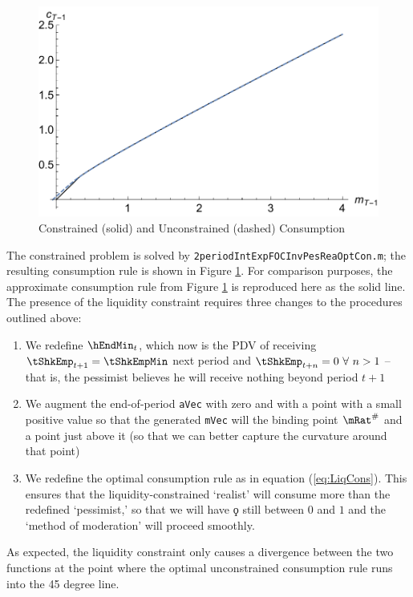 \documentclass[titlepage]{\econtex}
\begin{document}
\hypertarget{cVScCon}{}
\begin{figure}
        \includegraphics{./Figures/cVScCon}
        \caption{Constrained (solid) and Unconstrained (dashed) Consumption}
        \label{fig:cVScCon}
\end{figure}

The constrained problem is solved by
\texttt{2periodIntExpFOCInvPesReaOptCon.m}; the resulting consumption
rule is shown in Figure \ref{fig:cVScCon}. For comparison purposes,
the approximate consumption rule from Figure \ref{fig:cVScCon} is
reproduced here as the solid line. The presence of the liquidity
constraint requires three changes to the procedures outlined above:
\begin{enumerate}
\item We redefine
$\hEndMin_{t}$, which now is the PDV of receiving
$\tShkEmp_{t+1}=\tShkEmpMin$ next period and
$\tShkEmp_{t+n}=0~\forall~n>1$ -- that is, the pessimist believes he
will receive nothing beyond period $t+1$
\item We augment the end-of-period \texttt{aVec} with zero and with a point with a small positive value so that the generated 
\texttt{mVec} will the binding point $\mRat^{\#}$ and a point just above it (so that we can better capture the curvature
around that point)
\item We redefine the optimal consumption rule as
in equation (\ref{eq:LiqCons}).  This ensures that the
liquidity-constrained `realist' will consume more than the redefined
`pessimist,' so that we will have $\koppa$ still between $0$ and $1$
and the `method of moderation' will proceed smoothly. 
\end{enumerate}

As expected, the
liquidity constraint only causes a divergence between the two
functions at the point where the optimal unconstrained consumption
rule runs into the 45 degree line.
\end{document}
